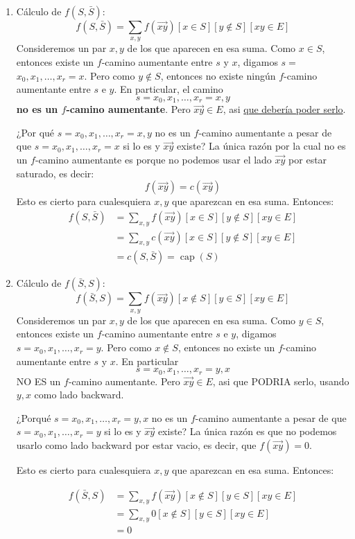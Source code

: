 \documentclass[a4paper]{article}
\begin{document}
\begin{enumerate}
    \item Cálculo de $f(S, \bar{S})$:
    $$
    f(S, \bar{S})=\sum_{x, y} f(\overrightarrow{x y})[x \in S][y \notin S][x y \in E]
    $$
    Consideremos un par $x, y$ de los que aparecen en esa suma. Como $x \in S$, entonces existe un $f$-camino aumentante entre $s$ y $x$, digamos $s=$ $x_{0}, x_{1}, \ldots, x_{r}=x$. Pero como $y \notin S$, entonces no existe ningún $f$-camino aumentante entre $s$ e $y$. En particular, el camino
    $$
    s=x_{0}, x_{1}, \ldots, x_{r}=x, y
    $$
    \textbf{no es un $f$-camino aumentante}. Pero $\overrightarrow{x y} \in E$, asi \underline{que debería poder serlo}.
    
    ¿Por qué $s=x_{0}, x_{1}, \ldots, x_{r}=x, y$ no es un $f$-camino aumentante a pesar de que $s=x_{0}, x_{1}, \ldots, x_{r}=x$ si lo es y $\overrightarrow{x y}$ existe? La única razón por la cual no es un $f$-camino aumentante es porque no podemos usar el lado $\overrightarrow{x y}$ por estar saturado, es decir:
    $$
    f(\overrightarrow{x y})=c(\overrightarrow{x y})
    $$
    Esto es cierto para cualesquiera $x, y$ que aparezcan en esa suma. Entonces:
    $$
    \begin{aligned}
    f(S, \bar{S}) & =\sum_{x, y} f(\overrightarrow{x y})[x \in S][y \notin S][x y \in E] \\
    & =\sum_{x, y} c(\overrightarrow{x y})[x \in S][y \notin S][x y \in E] \\
    & =c(S, \bar{S})=\operatorname{cap}(S)
    \end{aligned}
    $$
    \item Cálculo de $f(\bar{S}, S)$:
    $$
    f(\bar{S}, S)=\sum_{x, y} f(\overrightarrow{x y})[x \notin S][y \in S][x y \in E]
    $$
    Consideremos un par $x, y$ de los que aparecen en esa suma. Como $y \in S$, entonces existe un $f$-camino aumentante entre $s$ e $y$, digamos $s=x_{0}, x_{1}, \ldots, x_{r}=y$. Pero como $x \notin S$, entonces no existe un $f$-camino aumentante entre $s$ y $x$. En particular
    $$
    s=x_{0}, x_{1}, \ldots, x_{r}=y, x
    $$
    NO ES un $f$-camino aumentante. Pero $\overrightarrow{x y} \in E$, asi que PODRIA serlo, usando $y, x$ como lado backward.

    ¿Porqué $s=x_{0}, x_{1}, \ldots, x_{r}=y, x$ no es un $f$-camino aumentante a pesar de que $s=x_{0}, x_{1}, \ldots, x_{r}=y$ si lo es y $\overrightarrow{x y}$ existe? La única razón es que no podemos usarlo como lado backward por estar vacio, es decir, que $f(\overrightarrow{x y})=0$.

    Esto es cierto para cualesquiera $x, y$ que aparezcan en esa suma. Entonces:

    $$
    \begin{aligned}
    f(\bar{S}, S) & =\sum_{x, y} f(\overrightarrow{x y})[x \notin S][y \in S][x y \in E] \\
    & =\sum_{x, y} 0[x \notin S][y \in S][x y \in E] \\
    & =0
    \end{aligned}
    $$
\end{enumerate}
\end{document}
